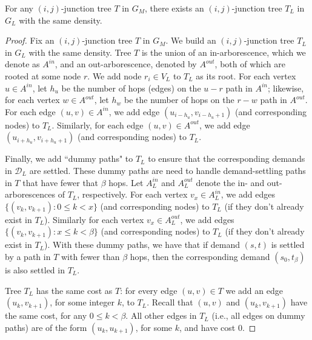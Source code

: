 \iflong
\begin{lemma}
\label{cl:input_to_layered}
    For any $(i,j)$-junction tree $T$ in $G_M$, there exists an $(i,j)$-junction tree $T_L$ in $G_L$ with the same density. 
\end{lemma}
\begin{proof}
    Fix an $(i,j)$-junction tree $T$ in $G_M$. We build an $(i,j)$-junction tree $T_L$ in $G_L$ with the same density. Tree $T$ is the union of an in-arborescence, which we denote as $A^{in}$, and an out-arborescence, denoted by $A^{out}$, both of which are rooted at some node $r$. We add node $r_i \in V_L$ to $T_L$ as its root. 
    For each vertex $u \in A^{in}$, let $h_u$ be the number of hops (edges) on the $u-r$ path in $A^{in}$; likewise, for each vertex $w \in A^{out}$, let $h_w$ be the number of hops on the $r-w$ path in $A^{out}$. For each edge $(u,v) \in A^{in}$, we add edge $(u_{i-h_u}, v_{i-h_u+1})$ (and corresponding nodes) to $T_L$. Similarly, for each edge $(u,v) \in A^{out}$, we add edge $(u_{i+h_u}, v_{i+h_u+1})$ (and corresponding nodes) to $T_L$.
   
    Finally, we add ``dummy paths" to $T_L$ to ensure that the corresponding demands in $\mathcal{D}_L$ are settled. These dummy paths are need to handle demand-settling paths in $T$ that have fewer that $\beta$ hops. Let $A^{in}_L$ and $A^{out}_L$ denote the in- and out-arborescences of $T_L$, respectively. For each vertex $v_x \in A^{in}_L$, we add edges $\{ (v_k, v_{k+1}) :  0 \leq k < x  \}$ (and corresponding nodes) to $T_L$ (if they don't already exist in $T_L$). Similarly for each vertex $v_x \in A^{out}_L$, we add edges $\{ (v_k, v_{k+1}) :  x \leq k < \beta  \}$ (and corresponding nodes) to $T_L$ (if they don't already exist in $T_L$). With these dummy paths, we have that if demand $(s,t)$ is settled by a path in $T$ with fewer than $\beta$ hops, then the corresponding demand $(s_0, t_\beta)$ is also settled in $T_L$.  

    Tree $T_L$ has the same cost as $T$: for every edge $(u,v) \in T$ we add an edge $(u_k, v_{k+1})$, for some integer $k$, to $T_L$. Recall that $(u,v)$ and $(u_k, v_{k+1})$ have the same cost, for any $0 \leq k < \beta$. All other edges in $T_L$ (i.e., all edges on dummy paths) are of the form $(u_k, u_{k+1})$, for some $k$, and have cost $0$. 
    

\end{proof}
